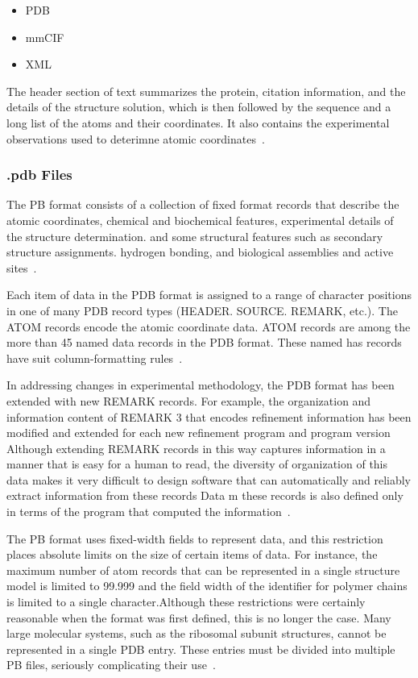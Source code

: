 \documentclass{report}
\begin{document}
\begin{itemize}
    \item PDB
    \item mmCIF
    \item XML
\end{itemize}

The header section of text summarizes the protein, citation information, and the details of the structure solution, which is then followed by the sequence and a long list of the atoms and their coordinates. It also contains the experimental observations used to deterimne atomic coordinates~\cite{noauthor_pdb101_nodate}.

\subsubsection{.pdb Files}

The PB format consists of a collection of fixed format records that describe the atomic coordinates, chemical and biochemical features, experimental details of the structure determination. and some structural features such as secondary structure assignments. hydrogen bonding, and biological assemblies and active sites~\cite{westbrook_pdb_2003}.

Each item of data in the PDB format is assigned to a range of character positions in one of many PDB record types (HEADER. SOURCE. REMARK, etc.). The ATOM records encode the atomic coordinate data. ATOM records are among the more than 45 named data records in the PDB format. These named has records have suit column-formatting rules~\cite{westbrook_pdb_2003}.

In addressing changes in experimental methodology, the PDB format has been extended with new REMARK records. For example, the organization and information content of REMARK 3 that encodes refinement information has been modified and extended for each new refinement program and program version Although extending REMARK records in this way captures information in a manner that is easy for a human to read, the diversity of organization of this data makes it very difficult to design software that can automatically and reliably extract information from these records Data m these records is also defined only in terms of the program that computed the information~\cite{westbrook_pdb_2003}.

The PB format uses fixed-width fields to represent data, and this restriction places absolute limits on the size of certain items of data. For instance, the maximum number of atom records that can be represented in a single structure model is limited to 99.999 and the field width of the identifier for polymer chains is limited to a single character.Although these restrictions were certainly reasonable when the format was first defined, this is no longer the case. Many large molecular systems, such as the ribosomal subunit structures, cannot be represented in a single PDB entry. These entries must be divided into multiple PB files, seriously complicating their use~\cite{westbrook_pdb_2003}.
\end{document}
